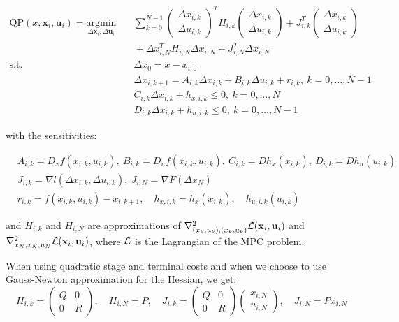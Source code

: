 \documentclass[12pt]{article}
\begin{document}
\begin{align*}
	\mathrm{QP}(x, \mathbf{x}_i, \mathbf{u}_i)=\underset{\Delta\mathbf{x}_i,\Delta\mathbf{u}_i}{\mathrm{argmin}} & \quad \sum_{k=0}^{N-1}\begin{pmatrix}\Delta x_{i,k}\\\Delta u_{i,k}\end{pmatrix}^TH_{i,k}\begin{pmatrix}\Delta x_{i,k}\\\Delta u_{i,k}\end{pmatrix}+J_{i,k}^T\begin{pmatrix}\Delta x_{i,k}\\\Delta u_{i,k}\end{pmatrix}\\
	&\quad +\Delta x_{i,N}^TH_{i,N}\Delta x_{i,N}+J_{i,N}^T\Delta x_{i,N}\\
	\text{s.t.} &\quad \Delta x_0=x-x_{i,0}\\
	&\quad \Delta x_{i,k+1}=A_{i,k}\Delta x_{i,k}+B_{i,k}\Delta u_{i,k}+r_{i,k},~k=0,\ldots,N-1\\
	&\quad C_{i,k}\Delta x_{i,k}+h_{x,i,k}\leq 0,~k=0,\ldots,N\\
	&\quad D_{i,k}\Delta x_{i,k}+h_{u,i,k}\leq 0,~k=0,\ldots,N-1
\end{align*}

\noindent with the sensitivities:

\begin{align*}
		&A_{i,k}=D_xf(x_{i,k}, u_{i,k}),~B_{i,k}=D_uf(x_{i,k}, u_{i,k}),~C_{i,k}=Dh_x(x_{i,k}),~D_{i,k}=Dh_u(u_{i,k})\\
		&J_{i,k}=\nabla l(\Delta x_{i,k},\Delta u_{i,k}),~J_{i,N}=\nabla F(\Delta x_N)\\
		&r_{i,k}=f(x_{i,k}, u_{i,k})-x_{i,k+1},\quad h_{x,i,k}=h_x(x_{i,k}),\quad h_{u,i,k}(u_{i,k})
\end{align*}

\noindent and $H_{i,k}$ and $H_{i,N}$ are approximations of $\nabla^2_{(x_k,u_k),(x_k,u_k)}\mathcal{L}(\mathbf{x}_i,\mathbf{u}_i)$ and $\nabla^2_{x_N,x_N,u_N}\mathcal{L}(\mathbf{x}_i,\mathbf{u}_i)$, where $\mathcal{L}$ is the Lagrangian of the MPC problem.

When using quadratic stage and terminal costs and when we choose to use Gauss-Newton approximation for the Hessian, we get:
\begin{equation*}
	H_{i,k}=\begin{pmatrix}Q&0\\0&R\end{pmatrix},\quad H_{i,N}=P,\quad J_{i,k}=\begin{pmatrix}Q&0\\0&R\end{pmatrix}\begin{pmatrix}x_{i,N}\\ u_{i,N}\end{pmatrix},\quad J_{i,N}=P x_{i,N}
\end{equation*}
\end{document}

